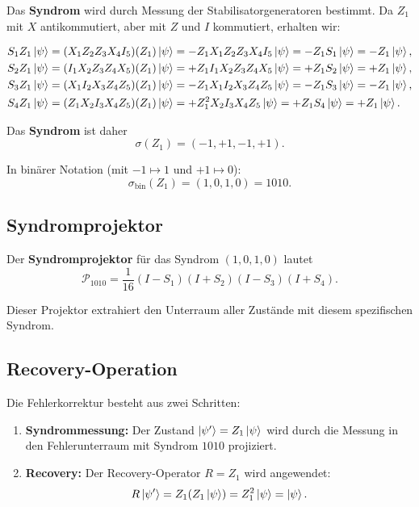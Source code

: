 \documentclass[11pt,a4paper]{article}
\begin{document}
Das \textbf{Syndrom} wird durch Messung der Stabilisatorgeneratoren bestimmt. Da $Z_1$ mit $X$ antikommutiert, aber mit $Z$ und $I$ kommutiert, erhalten wir:

\begin{align}
S_1 Z_1 \ket{\psi} &= (X_1 Z_2 Z_3 X_4 I_5)(Z_1) \ket{\psi} = -Z_1 X_1 Z_2 Z_3 X_4 I_5 \ket{\psi} = -Z_1 S_1 \ket{\psi} = -Z_1 \ket{\psi}, \\
S_2 Z_1 \ket{\psi} &= (I_1 X_2 Z_3 Z_4 X_5)(Z_1) \ket{\psi} = +Z_1 I_1 X_2 Z_3 Z_4 X_5 \ket{\psi} = +Z_1 S_2 \ket{\psi} = +Z_1 \ket{\psi}, \\
S_3 Z_1 \ket{\psi} &= (X_1 I_2 X_3 Z_4 Z_5)(Z_1) \ket{\psi} = -Z_1 X_1 I_2 X_3 Z_4 Z_5 \ket{\psi} = -Z_1 S_3 \ket{\psi} = -Z_1 \ket{\psi}, \\
S_4 Z_1 \ket{\psi} &= (Z_1 X_2 I_3 X_4 Z_5)(Z_1) \ket{\psi} = +Z_1^2 X_2 I_3 X_4 Z_5 \ket{\psi} = +Z_1 S_4 \ket{\psi} = +Z_1 \ket{\psi}.
\end{align}

Das \textbf{Syndrom} ist daher
\[
\sigma(Z_1) = (-1, +1, -1, +1).
\]

In binärer Notation (mit $-1 \mapsto 1$ und $+1 \mapsto 0$):
\[
\sigma_{\text{bin}}(Z_1) = (1, 0, 1, 0) = 1010.
\]

\subsection{Syndromprojektor}

Der \textbf{Syndromprojektor} für das Syndrom $(1,0,1,0)$ lautet
\[
\mathcal{P}_{1010} = \frac{1}{16} (I - S_1)(I + S_2)(I - S_3)(I + S_4).
\]

Dieser Projektor extrahiert den Unterraum aller Zustände mit diesem spezifischen Syndrom.

\subsection{Recovery-Operation}

Die Fehlerkorrektur besteht aus zwei Schritten:

\begin{enumerate}
\item \textbf{Syndrommessung:} Der Zustand $\ket{\psi'} = Z_1 \ket{\psi}$ wird durch die Messung in den Fehlerunterraum mit Syndrom $1010$ projiziert.
\item \textbf{Recovery:} Der Recovery-Operator $R = Z_1$ wird angewendet:
\[
R \ket{\psi'} = Z_1 (Z_1 \ket{\psi}) = Z_1^2 \ket{\psi} = \ket{\psi}.
\]
\end{enumerate}
\end{document}
